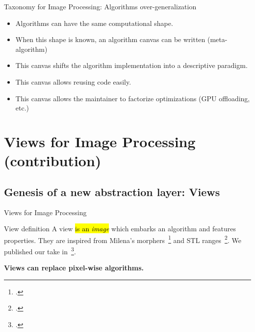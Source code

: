 \documentclass[12pt,aspectratio=169]{beamer}
\makeatletter
\let\HL\hl
\renewcommand\hl{%
  \let\set@color\beamerorig@set@color
  \let\reset@color\beamerorig@reset@color
  \HL}
\makeatother
\begin{document}
\begin{frame}[fragile]{Taxonomy for Image Processing: Algorithms over-generalization}
  \begin{itemize}
    \item Algorithms can have the same computational shape.
    \item When this shape is known, an algorithm canvas can be written (meta-algorithm)
    \item This canvas shifts the algorithm implementation into a descriptive paradigm.
    \item This canvas allows reusing code easily.
    \item This canvas allows the maintainer to factorize optimizations (GPU offloading, etc.)
  \end{itemize}
\end{frame}

%
%
%
\section[Views for Image Processing (contribution)]{Views for Image Processing (contribution)}

\subsection{Genesis of a new abstraction layer: Views}

\begin{frame}[fragile]{Views for Image Processing}
  \begin{alertblock}{View definition}
    A view \hl{is an \emph{image}} which embarks an algorithm and features properties. They are inspired from Milena's
    morphers~\footcite{levillain.2009.ismm} and STL ranges~\footcite{niebler.2014.ranges}. We published our take
    in~\footcite{roynard.2022.gpce}.

  \end{alertblock}
  \begin{center}\textbf{Views can replace pixel-wise algorithms.}\end{center}
\end{frame}
\end{document}
